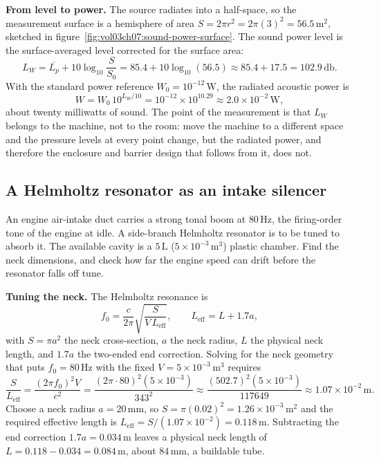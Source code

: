 \textbf{From level to power.} The source radiates into a half-space, so
the measurement surface is a hemisphere of area
$S = 2\pi r^2 = 2\pi(3)^2 = 56.5\,\si{\meter\squared}$, sketched in
figure~\ref{fig:vol03ch07:sound-power-surface}. The sound power level
is the surface-averaged level corrected for the surface area:
\[
L_W = \overline{L_p} + 10\log_{10}\frac{S}{S_0}
    = 85.4 + 10\log_{10}(56.5) \approx 85.4 + 17.5 = 102.9\,\si{\decibel}.
\]
With the standard power reference $W_0 = 10^{-12}\,\si{\watt}$, the
radiated acoustic power is
\[
W = W_0\,10^{L_W/10} = 10^{-12}\times 10^{10.29}
  \approx 2.0\times 10^{-2}\,\si{\watt},
\]
about twenty milliwatts of sound. The point of the measurement is that
$L_W$ belongs to the machine, not to the room: move the machine to a
different space and the pressure levels at every point change, but the
radiated power, and therefore the enclosure and barrier design that
follows from it, does not.



\subsection{A Helmholtz resonator as an intake silencer}

An engine air-intake duct carries a strong tonal boom at
$80\,\si{\hertz}$, the firing-order tone of the engine at idle. A
side-branch Helmholtz resonator is to be tuned to absorb it. The
available cavity is a $5\,\si{\liter}$ ($5\times 10^{-3}\,\si{
\meter\cubed}$) plastic chamber. Find the neck dimensions, and check
how far the engine speed can drift before the resonator falls off tune.

\textbf{Tuning the neck.} The Helmholtz resonance is
\[
f_0 = \frac{c}{2\pi}\sqrt{\frac{S}{V\,L_{\text{eff}}}},
\qquad L_{\text{eff}} = L + 1.7a,
\]
with $S=\pi a^2$ the neck cross-section, $a$ the neck radius, $L$ the
physical neck length, and $1.7a$ the two-ended end correction. Solving
for the neck geometry that puts $f_0 = 80\,\si{\hertz}$ with the fixed
$V = 5\times 10^{-3}\,\si{\meter\cubed}$ requires
\[
\frac{S}{L_{\text{eff}}} = \frac{(2\pi f_0)^2 V}{c^2}
= \frac{(2\pi\cdot 80)^2 (5\times 10^{-3})}{343^2}
\approx \frac{(502.7)^2 (5\times 10^{-3})}{117649}
\approx 1.07\times 10^{-2}\,\si{\meter}.
\]
Choose a neck radius $a = 20\,\si{\milli\meter}$, so
$S = \pi(0.02)^2 = 1.26\times 10^{-3}\,\si{\meter\squared}$ and the
required effective length is
$L_{\text{eff}} = S/(1.07\times 10^{-2}) = 0.118\,\si{\meter}$.
Subtracting the end correction $1.7a = 0.034\,\si{\meter}$ leaves a
physical neck length of $L = 0.118 - 0.034 = 0.084\,\si{\meter}$, about
$84\,\si{\milli\meter}$, a buildable tube.

